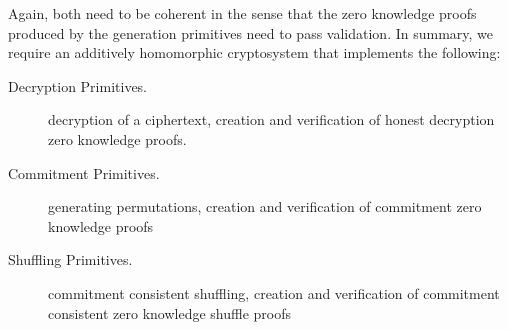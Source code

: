 \noindent
Again, both need to be coherent in the sense that the zero knowledge
proofs produced by the generation primitives need to pass
validation. In summary, we require an additively homomorphic
cryptosystem that implements the following:

\begin{description}
\item[Decryption Primitives.]
  decryption of a ciphertext, creation and verification of
 honest decryption zero knowledge proofs. 
%  
%    
% 
%    
% 
%    
% 
%  
%  
%
% 
%  
%  
%        
% 
%        
\item[Commitment Primitives.]
  generating permutations, creation and verification of commitment
  zero knowledge proofs
\item[Shuffling Primitives.]
  commitment consistent shuffling, creation and verification of
  commitment consistent zero knowledge shuffle proofs 
\end{description}

